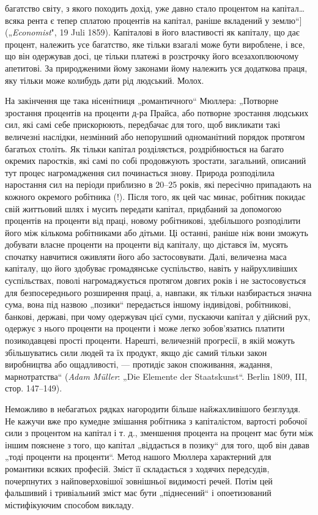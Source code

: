 \parcont{}  %
багатство світу, з якого походить дохід, уже давно стало процентом
на капітал\dots{} всяка рента є тепер сплатою процентів на
капітал, раніше вкладений у землю“] („\emph{Economist}", 19 Juli 1859).
Капіталові в його властивості як капіталу, що дає процент, належить
усе багатство, яке тільки взагалі може бути вироблене,
і все, що він одержував досі, це тільки платежі в розстрочку його
всезахоплюючому апетитові. За природженими йому законами
йому належить уся додаткова праця, яку тільки може колибудь
дати рід людський. Молох.

На закінчення ще така нісенітниця „романтичного“ Мюллера:
„Потворне зростання процентів на проценти д-ра Прайса, або
потворне зростання людських сил, які самі себе прискорюють,
передбачає для того, щоб викликати такі величезні наслідки,
незмінний або непорушний одноманітний порядок протягом багатьох
століть. Як тільки капітал розділяється, роздрібнюється
на багато окремих паростків, які самі по собі продовжують
зростати, загальний, описаний тут процес нагромадження сил
починається знову. Природа розподілила наростання сил на
періоди приблизно в 20--25 років, які пересічно припадають
на кожного окремого робітника (!). Після того, як цей час
минає, робітник покидає свій життьовий шлях і мусить передати
капітал, придбаний за допомогою процентів на проценти від
праці, новому робітникові, здебільшого розподілити його між
кількома робітниками або дітьми. Ці останні, раніше ніж вони
зможуть добувати власне проценти на проценти від капіталу,
що дістався їм, мусять спочатку навчитися оживляти його або
застосовувати. Далі, величезна маса капіталу, що його здобуває
громадянське суспільство, навіть у найрухливіших суспільствах,
поволі нагромаджується протягом довгих років і не
застосовується для безпосереднього розширення праці, а, навпаки,
як тільки назбирається значна сума, вона під назвою „позики“
передається іншому індивідові, робітникові, банкові, державі,
при чому одержувач цієї суми, пускаючи капітал у дійсний рух,
одержує з нього проценти на проценти і може легко зобов’язатись
платити позикодавцеві прості проценти. Нарешті, величезній
прогресії, в якій можуть збільшуватись сили людей та їх
продукт, якщо діє самий тільки закон виробництва або ощадливості,
— протидіє закон споживання, жадання, марнотратства“
(\emph{Adam Müller}: „Die Elemente der Staatskunst“. Berlin 1809, III,
стор. 147--149).

Неможливо в небагатьох рядках нагородити більше найжахливішого
безглуздя. Не кажучи вже про кумедне змішання
робітника з капіталістом, вартості робочої сили з процентом
на капітал і т. д., зменшення процента на процент має бути
між іншим пояснене з того, що капітал „віддається в позику“ для
того, щоб він давав „тоді проценти на проценти“. Метод нашого
Мюллера характерний для романтики всяких професій. Зміст її
складається з ходячих передсудів, почерпнутих з найповерховішої
зовнішньої видимості речей. Потім цей фальшивий і тривіальний
зміст має бути „піднесений“ і опоетизований містифікуючим
способом викладу.

